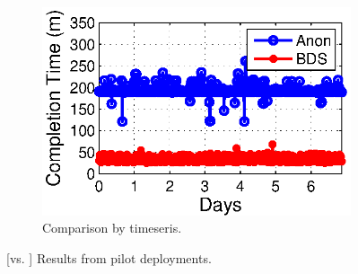 \begin{figure}[t]
\begin{subfigure}[b]{0.3\textwidth}
                \includegraphics[width=\textwidth]{images/BDSvsAnon_time.eps}
                \caption{Comparison by timeseris.}
                \label{fig:BDSvsAnon:time}
        \end{subfigure}
        \caption{[\name vs. \company] Results from pilot deployments.}
        \label{fig:BDSvsAnon}
\vspace{-0.4cm}
\end{figure}


